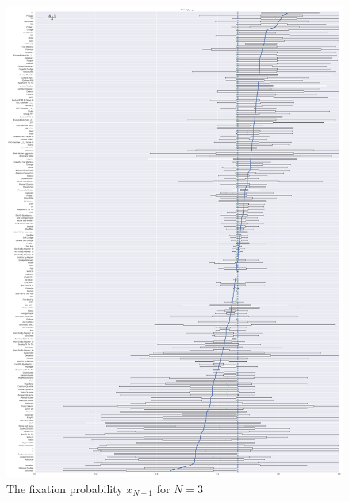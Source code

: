 \documentclass{article}
\begin{document}
\begin{figure}[!hbtp]
    \centering
    \includegraphics[height=.8\textheight]{./img/boxplot_3_resist.pdf}
    \caption{The fixation probability \(x_{N-1}\) for \(N=3\)}
    \label{fig:boxplot_3_resist}
\end{figure}
\end{document}
